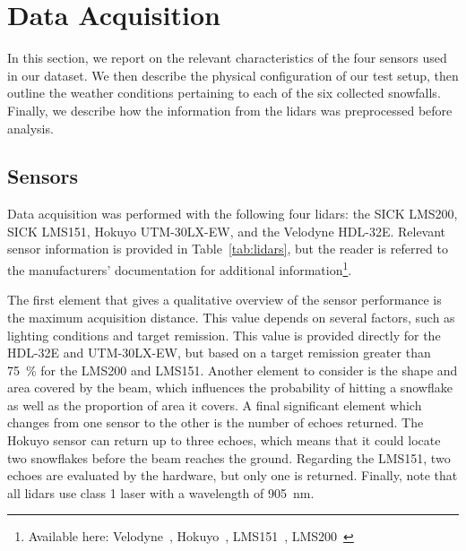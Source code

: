 \section{Data Acquisition}
\label{sec:chap_lidar_data_acquisition}

In this section, we report on the relevant characteristics of the four sensors used in our dataset. We then describe the physical configuration of our test setup, then outline the weather conditions pertaining to each of the six collected snowfalls. Finally, we describe how the information from the \gls*{lidar}s was preprocessed before analysis.

\subsection{Sensors}

Data acquisition was performed with the following four \gls*{lidar}s: the SICK LMS200, SICK LMS151, Hokuyo UTM-30LX-EW, and the Velodyne HDL-32E. Relevant sensor information is provided in Table~\ref{tab:lidars}, but the reader is referred to the manufacturers' documentation for additional information\footnote{Available here: Velodyne~\citep{VelodyneManual}, Hokuyo~\citep{UTMDatasheet}, LMS151~\citep{LMS151Datasheet}, LMS200~\citep{LMS200Manual}}.

The first element that gives a qualitative overview of the sensor performance is the maximum acquisition distance. This value depends on several factors, such as lighting conditions and target remission. This value is provided directly for the HDL-32E and UTM-30LX-EW, but based on a target remission greater than \SI{75}{\percent} for the LMS200 and LMS151. Another element to consider is the shape and area covered by the beam, which influences the probability of hitting a snowflake as well as the proportion of area it covers. A final significant element which changes from one sensor to the other is the number of echoes returned. The Hokuyo sensor can return up to three echoes, which means that it could locate two snowflakes before the beam reaches the ground. Regarding the LMS151, two echoes are evaluated by the hardware, but only one is returned. Finally, note that all \gls*{lidar}s use class 1 laser with a wavelength of \SI{905}{\nano\meter}.

